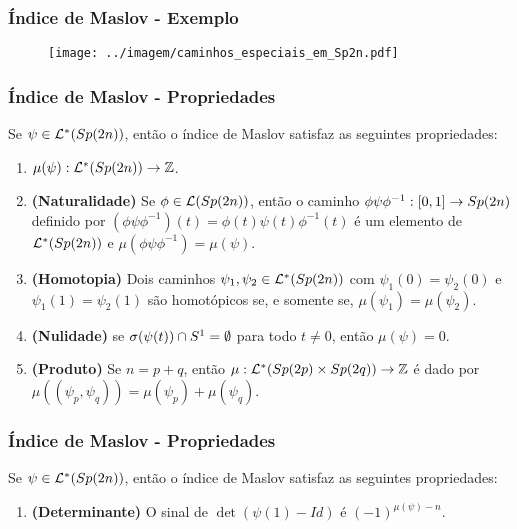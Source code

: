 \documentclass{beamer}
\begin{document}
\begin{footnotesize}
\begin{frame}
	\end{frame}
	
	\begin{frame}
			\frametitle{Índice de Maslov - Exemplo}
			\begin{figure}[!h]
				\centering
				\texttt{[image: ../imagem/caminhos\_especiais\_em\_Sp2n.pdf]}
			\end{figure}
	\end{frame}
	
	\begin{frame}			
		\frametitle{Índice de Maslov - Propriedades}
		
		\begin{teorema}
			Se $\psi \in \mathcal{L}^{*}(Sp(2n))$, então o índice de Maslov satisfaz as seguintes propriedades:
			\begin{enumerate}
				\item $\mu(\psi):\mathcal{L}^{*}(Sp(2n)) \to \mathbb{Z}$.
				
				\item \textbf{(Naturalidade)}\label{item_naturalidade_maslov} Se $\phi\in \mathcal{L}(Sp(2n))$, então o caminho $\phi\psi\phi^{-1}: [0,1] \to Sp(2n)$ definido por $(\phi\psi\phi^{-1})(t) = \phi(t)\psi(t)\phi^{-1}(t)$ é um elemento de $\mathcal{L}^{*}(Sp(2n))$ e $\mu(\phi\psi\phi^{-1}) = \mu(\psi)$.
				
				\item \textbf{(Homotopia)} \label{item_homotopia_caminhos_teorema_indice_maslov} Dois caminhos $\psi_{1}, \psi_{2}\in \mathcal{L}^{*}(Sp(2n)) $ com $\psi_{1}(0) = \psi_{2}(0)$ e $\psi_{1}(1) = \psi_{2}(1)$ são homotópicos se, e somente se, $\mu(\psi_{1}) = \mu(\psi_{2})$.
				
				\item \textbf{(Nulidade)} se $\sigma(\psi(t))\cap S^{1} = \emptyset$ para todo $t\neq 0$, então $\mu(\psi) = 0$.
				
					\item \textbf{(Produto)} Se $n=p+q$, então  $\mu:\mathcal{L}^{*}(Sp(2p)\times Sp(2q)) \to \mathbb{Z}$ é dado por $\mu((\psi_{p}, \psi_{q})) = \mu(\psi_{p})+\mu(\psi_{q})$.
			\end{enumerate}
		\end{teorema}
	\end{frame}
	
	\begin{frame}
		\frametitle{Índice de Maslov - Propriedades}
			\begin{teorema}
				Se $\psi \in \mathcal{L}^{*}(Sp(2n))$, então o índice de Maslov satisfaz as seguintes propriedades:
				\begin{enumerate}
				\item \textbf{(Determinante)} O sinal de $ \det(\psi(1)-Id)$ é $(-1)^{\mu(\psi)-n}$.
					

\end{enumerate}
\end{teorema}
\end{frame}
\end{footnotesize}
\end{document}
